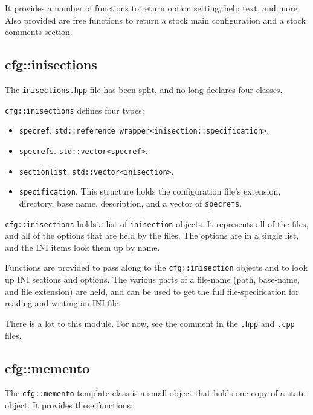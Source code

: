    It provides a number of functions to return option setting, help text, and
   more.
   Also provided are free functions to return a stock main configuration
   and a stock comments section.

\subsection{cfg::inisections}
\label{subsec:cfg_namespace_inisections}

   The \texttt{inisections.hpp} file has been split,
   and no long declares four classes.

   \texttt{cfg::inisections} defines four types:

   \begin{itemize}
      \item \texttt{specref}.
          \texttt{std::reference\_wrapper<inisection::specification>}.
      \item \texttt{specrefs}.
          \texttt{std::vector<specref>}.
      \item \texttt{sectionlist}.
         \texttt{std::vector<inisection>}.
      \item \texttt{specification}.
         This structure holds the configuration file's extension,
         directory, base name, description, and a vector of
         \texttt{specrefs}.
   \end{itemize}

   \texttt{cfg::inisections} holds a list of \texttt{inisection} objects.
   It represents all of the files, and all of
   the options that are held by the files.
   The options are in a single list,
   and the INI items look them up by name.

   Functions are provided to pass along to the \texttt{cfg::inisection}
   objects and to look up INI sections and options.
   The various parts of a file-name (path, base-name, and file extension)
   are held, and can be used to get the full file-specification for
   reading and writing an INI file.

   There is a lot to this module.
   For now, see the comment in the \texttt{.hpp} and \texttt{.cpp} files.

\subsection{cfg::memento}
\label{subsec:cfg_namespace_memento}

   The \texttt{cfg::memento} template class is a small object that holds one
   copy of a state object.
   It provides these functions:

